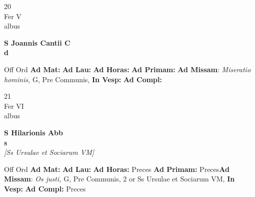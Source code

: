 \documentclass[10pt, openany]{book}
\begin{document}
    \begin{center}
        \begin{minipage}{3.5in}
            \vspace{2em}
            \begin{minipage}{0.5in}
                {\Huge 20} \\
                {\normalsize Fer V} \\
                {\normalsize albus}
            \end{minipage}
            \begin{minipage}{3.0in}
                \textbf{ \large S Joannis Cantii C \\
                \textnormal{\normalsize d}} \\ 
            \end{minipage}
            \begin{justify}Off Ord
                \textbf{Ad Mat: }
                \textbf{Ad Lau: }
                \textbf{Ad Horas: }
                \textbf{Ad Primam: }\textbf{Ad Missam}: \textit{Miseratio hominis,} G, Pre Communis,  
                \textbf{In Vesp: }
                \textbf{Ad Compl: }
            \end{justify}
        \end{minipage}
    \end{center}

    \begin{center}
        \begin{minipage}{3.5in}
            \vspace{2em}
            \begin{minipage}{0.5in}
                {\Huge 21} \\
                {\normalsize Fer VI} \\
                {\normalsize albus}
            \end{minipage}
            \begin{minipage}{3.0in}
                \textbf{ \large S Hilarionis Abb \\
                \textnormal{\normalsize s}} \\ \textit{[Ss Ursulae et Sociarum VM]} \\ 
            \end{minipage}
            \begin{justify}Off Ord
                \textbf{Ad Mat: }
                \textbf{Ad Lau: }
                \textbf{Ad Horas: }Preces
                \textbf{Ad Primam: }Preces\textbf{Ad Missam}: \textit{Os justi,} G, Pre Communis, 2 or Ss Ursulae et Sociarum VM,  
                \textbf{In Vesp: }
                \textbf{Ad Compl: }Preces
            \end{justify}
        \end{minipage}
    \end{center}
\end{document}
